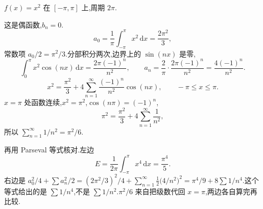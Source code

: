 \begin{example}
$f(x)=x^2$ 在 $[-\pi,\pi]$ 上,周期 $2\pi$.
\end{example}
\begin{solution}
这是偶函数,$b_n=0$.
\begin{equation}
  a_0=\frac{1}{\pi}\int_{-\pi}^{\pi}x^2\,\mathrm{d}x=\frac{2\pi^2}{3},
\end{equation}
常数项 $a_0/2=\pi^2/3$.分部积分两次,边界上的 $\sin(nx)$ 是零,
\begin{equation}
  \int_0^{\pi}x^2\cos(nx)\,\mathrm{d}x=\frac{2\pi(-1)^n}{n^2},
  \qquad
  a_n=\frac{2}{\pi}\cdot\frac{2\pi(-1)^n}{n^2}=\frac{4(-1)^n}{n^2}.
\end{equation}
\begin{equation}
  x^2=\frac{\pi^2}{3}+4\sum_{n=1}^{\infty}\frac{(-1)^n}{n^2}\cos(nx),
  \qquad -\pi\leq x\leq\pi.
\end{equation}
$x=\pi$ 处函数连续,$x^2=\pi^2$,$\cos(n\pi)=(-1)^n$,
\begin{equation}
  \pi^2=\frac{\pi^2}{3}+4\sum_{n=1}^{\infty}\frac{1}{n^2},
\end{equation}
所以 $\sum_{n=1}^{\infty}1/n^2=\pi^2/6$.

再用 Parseval 等式核对.左边
\begin{equation}
  E=\frac{1}{2\pi}\int_{-\pi}^{\pi}x^4\,\mathrm{d}x=\frac{\pi^4}{5}.
\end{equation}
右边是 $a_0^2/4+\sum a_n^2/2=(2\pi^2/3)^2/4+\sum_{n=1}^{\infty}\frac12\bigl(4/n^2\bigr)^2=\pi^4/9+8\sum 1/n^4$.这个等式给出的是 $\sum 1/n^4$,不是 $\sum 1/n^2$.$\pi^2/6$ 来自把级数代回 $x=\pi$,两边各自算完再比较.
\end{solution}

